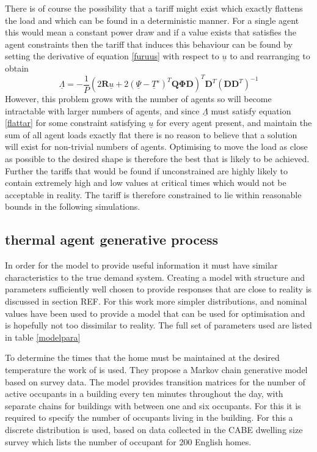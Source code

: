\documentclass[a4paper, 10 pt, conference]{ieeeconf}  %
\begin{document}
There is of course the possibility that a tariff might exist which exactly flattens the load and which can be found in a deterministic manner. For a single agent this would mean a constant power draw and if a value exists that satisfies the agent constraints then the tariff that induces this behaviour can be found by setting the derivative of equation \ref{furuus} with respect to $\underline{u}$ to and rearranging to obtain
\begin{equation}
\label{flattar}
\underline{\Lambda} = -\frac{1}{P}\left( 2\mathbf{R}\underline{u} + 2(\underline{\Psi}-\underline{T}^s)^{T}\mathbf{Q}\boldsymbol{\Phi}\mathbf{D}\right)^{T}\mathbf{D}^T(\mathbf{DD}^{T})^{-1}
\end{equation}
However, this problem grows with the number of agents so will become intractable with larger numbers of agents, and since $\underline{\Lambda}$ must satisfy equation \ref{flattar} for some constraint satisfying $\underline{u}$ for every agent present, and maintain the sum of all agent loads exactly flat there is no reason to believe that a solution will exist for non-trivial numbers of agents. Optimising to move the load as close as possible to the desired shape is therefore the best that is likely to be achieved. Further the tariffs that would be found if unconstrained are highly likely to contain extremely high and low values at critical times which would not be acceptable in reality. The tariff is therefore constrained to lie within reasonable bounds in the following simulations.
\subsection{thermal agent generative process}
In order for the model to provide useful information it must have similar characteristics to the true demand system. Creating a model with structure and parameters sufficiently well chosen to provide responses that are close to reality is discussed in section REF. For this work more simpler distributions, and nominal values have been used to provide a model that can be used for optimisation and is hopefully not too dissimilar to reality. The full set of parameters used are listed in table \ref{modelpara}

To determine the times that the home must be maintained at the desired temperature the work of \cite{richardson2008high} is used. They propose a Markov chain generative model based on survey data. The model provides transition matrices for the number of active occupants in a building every ten minutes throughout the day, with separate chains for buildings with between one and six occupants. For this it is required to specify the number of occupants living in the building. For this a discrete distribution is used, based on data collected in the CABE dwelling size survey \cite{CABE} which lists the number of occupant for 200 English homes.
\end{document}
